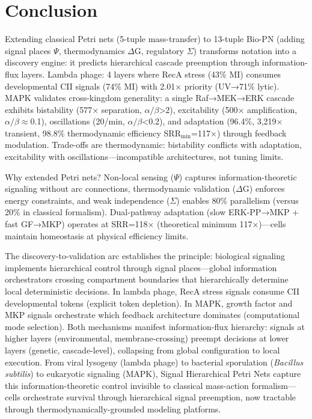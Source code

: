 \documentclass[twocolumn,11pt]{article}
\begin{document}
\section*{Conclusion}

Extending classical Petri nets (5-tuple mass-transfer) to 13-tuple Bio-PN (adding signal places $\Psi$, thermodynamics $\Delta$G, regulatory $\Sigma$) transforms notation into a discovery engine: it predicts hierarchical cascade preemption through information-flux layers. Lambda phage: 4 layers where RecA stress (43\% MI) consumes developmental CII signals (74\% MI) with 2.01× priority (UV→71\% lytic). MAPK validates cross-kingdom generality: a single Raf→MEK→ERK cascade exhibits bistability (577× separation, $\alpha/\beta$>2), excitability (500× amplification, $\alpha/\beta$$\approx$0.1), oscillations (20/min, $\alpha/\beta$<0.2), and adaptation (96.4\%, 3,219× transient, 98.8\% thermodynamic efficiency SRR$_{\text{min}}$=117×) through feedback modulation. Trade-offs are thermodynamic: bistability conflicts with adaptation, excitability with oscillations—incompatible architectures, not tuning limits.

Why extended Petri nets? Non-local sensing ($\Psi$) captures information-theoretic signaling without arc connections, thermodynamic validation ($\Delta$G) enforces energy constraints, and weak independence ($\Sigma$) enables 80\% parallelism (versus 20\% in classical formalism). Dual-pathway adaptation (slow ERK-PP→MKP + fast GF→MKP) operates at SRR=118× (theoretical minimum 117×)—cells maintain homeostasis at physical efficiency limits.

The discovery-to-validation arc establishes the principle: biological signaling implements hierarchical control through signal places—global information orchestrators crossing compartment boundaries that hierarchically determine local deterministic decisions. In lambda phage, RecA stress signals consume CII developmental tokens (explicit token depletion). In MAPK, growth factor and MKP signals orchestrate which feedback architecture dominates (computational mode selection). Both mechanisms manifest information-flux hierarchy: signals at higher layers (environmental, membrane-crossing) preempt decisions at lower layers (genetic, cascade-level), collapsing from global configuration to local execution. From viral lysogeny (lambda phage) to bacterial sporulation (\emph{Bacillus subtilis}) to eukaryotic signaling (MAPK), Signal Hierarchical Petri Nets capture this information-theoretic control invisible to classical mass-action formalism—cells orchestrate survival through hierarchical signal preemption, now tractable through thermodynamically-grounded modeling platforms.
\end{document}
